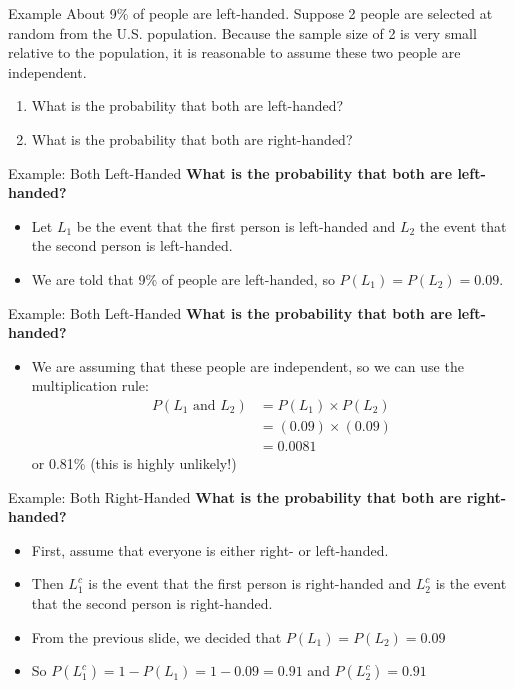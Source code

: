 \begin{frame}{Example}
    About 9\% of people are left-handed. Suppose 2 people are selected at random from the U.S. population. Because the sample size of 2 is very small relative to the population, it is reasonable to assume these two people are independent.
    \begin{enumerate}
        \item What is the probability that both are left-handed?
        \item What is the probability that both are right-handed?
    \end{enumerate} 
\end{frame}

\begin{frame}{Example: Both Left-Handed}
    \textbf{What is the probability that both are left-handed?}
    \begin{itemize}
        \item Let $L_1$ be the event that the first person is left-handed and $L_2$ the event that the second person is left-handed.
        \item We are told that 9\% of people are left-handed, so $P(L_1)=P(L_2)=0.09$.
    \end{itemize}
\end{frame}

\begin{frame}{Example: Both Left-Handed}
    \textbf{What is the probability that both are left-handed?}
    \begin{itemize}
        \item We are assuming that these people are independent, so we can use the multiplication rule:
        \begin{align*}
        P(L_1\text{ and }L_2) &= P(L_1) \times P(L_2) \\
        &= (0.09)\times(0.09) \\
        &= 0.0081
        \end{align*}
        or 0.81\% (this is highly unlikely!)
    \end{itemize}
\end{frame}

\begin{frame}{Example: Both Right-Handed}
    \textbf{What is the probability that both are right-handed?}
    \begin{itemize}
        \item First, assume that everyone is either right- or left-handed.
        \item Then $L_1^c$ is the event that the first person is right-handed and $L_2^c$ is the event that the second person is right-handed.
        \item From the previous slide, we decided that $P(L_1)=P(L_2)=0.09$
        \item So $P(L_1^c)=1-P(L_1)=1-0.09=0.91$ and $P(L_2^c)=0.91$
    \end{itemize}
\end{frame}

